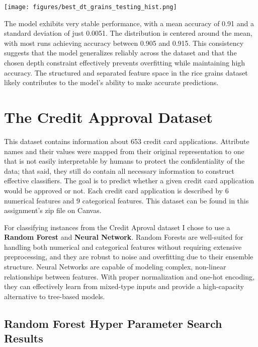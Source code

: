 \documentclass[letterpaper]{article}
\begin{document}
\vspace{0.2in}
    \begin{minipage}{\linewidth}
        \centering
        \texttt{[image: figures/best\_dt\_grains\_testing\_hist.png]}
    \end{minipage}
\vspace{0.1in}

The model exhibits very stable performance, with a mean accuracy of 0.91 and a standard deviation of just 0.0051. The distribution is centered around the mean, with most runs achieving accuracy between 0.905 and 0.915. This consistency suggests that the model generalizes reliably across the dataset and that the chosen depth constraint effectively prevents overfitting while maintaining high accuracy. The structured and separated feature space in the rice grains dataset likely contributes to the model’s ability to make accurate predictions.


\clearpage

\section{ The Credit Approval Dataset}

This dataset contains information about 653 credit card applications. Attribute names and their values were mapped from their original representation to one that is not easily interpretable by humans to protect the confidentiality of the data; that said, they still do contain all necessary information to construct effective classifiers. The goal is to predict whether a given credit card application would be approved or not. Each
credit card application is described by 6 numerical features and 9 categorical features. This dataset can be found in this assignment’s zip file on Canvas.

For classifying instances from the Credit Aproval dataset I chose to use a \textbf{Random Forest} and \textbf{Neural Network}. Random Forests are well-suited for handling both numerical and categorical features without requiring extensive preprocessing, and they are robust to noise and overfitting due to their ensemble structure. Neural Networks are capable of modeling complex, non-linear relationships between features. With proper normalization and one-hot encoding, they can effectively learn from mixed-type inputs and provide a high-capacity alternative to tree-based models. 

\subsection{Random Forest Hyper Parameter Search Results}
\end{document}
